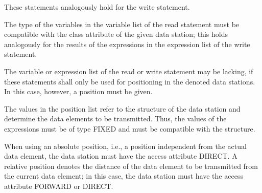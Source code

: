 These statements analogously hold for the write statement.

The type of the variables in the variable list of the read statement
must be compatible with the class attribute of the given data station;
this holds analogously for the results of the expressions in the
expression list of the write statement.

The variable or expression list of the read or write statement may be
lacking, if these statements shall only be used for positioning in the
denoted data stations. In this case, however, a position must be
given.

The values in the position list refer to the structure of the data
station and determine the data elements to be transmitted. Thus, the
values of the expressions must be of type FIXED and must be compatible
with the structure.

When using an absolute position, i.e., a position independent from the
actual data element, the data station must have the access attribute
DIRECT. A relative position denotes the distance of the data element to
be transmitted from the current data element; in this case, the data
station must have the access attribute FORWARD
 or DIRECT.

